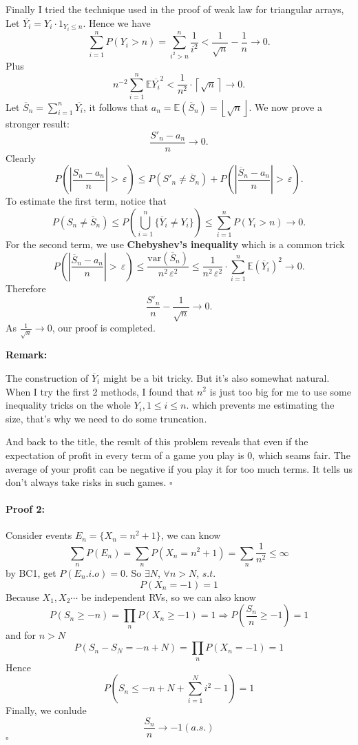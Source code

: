 \documentclass[UTF8]{article}
\let\ldots\cdots
\newcommand\ep{\,\varepsilon}
\begin{document}
		Finally I tried the technique used in the proof of weak law for triangular arrays, 
		Let $\overline{Y_{i}}= Y_{i} \cdot 1_{Y_{i} \le  n}$. Hence we have 
		\[
				\sum_{i=1}^{n} P\left( Y_{i} > n \right) = 
				\sum_{i^2 > n}^{n} \frac{1}{i^2} < \frac{1}{\sqrt{n} } - \frac{1}{n}
				\to  0
		.\]
		Plus 
		\[
		n^{-2} \sum_{i=1}^{n} \mathbb{E} \overline{Y_i}^2 < 
		\frac{1}{n^2} \cdot \left\lceil \sqrt{n}  \right\rceil \to  0 
		.\] 
		Let $\overline{S}_n = \sum_{i=1}^{n} \overline{Y_i}$, it follows 
		that $a_n = \mathbb{E} \left( \overline{S}_n \right) = \left\lfloor \sqrt{n}  \right\rfloor$. We now prove a stronger result: 
		\[
				\frac{ S'_n -a_n }{n} \to  0  
		.\] 
		Clearly
		\[
				P\left( \left| \frac{S_n-a_n}{n} \right| > \ep \right) \le 
				P\left( S'_n \neq \overline{S}_n \right) + 
				P \left( \left| \frac{\overline{S}_n-a_n}{n} \right| > \ep  \right) 
		.\] 
		To estimate the first term, notice that 
		\[
				P\left( S_n \neq \overline{S}_n \right) \le  
				P \left( \bigcup_{i=1}^{n} \{ \overline{Y}_i\neq Y_i\}   \right) 
				\le \sum_{i=1}^{n} P\left( Y_i > n \right) \to 0
		.\] 
		For the second term, we use \textbf{Chebyshev's inequality} which is a 
		common trick
		\[
				P \left( \left| \frac{\overline{S}_n-a_n}{n} \right| > \ep  \right) 
				\le  \frac{ \mathrm{var}\left( \overline{S}_n \right)   }{ n^2\ep^2}
				\le \frac{1}{n^2\ep^2} \cdot \sum_{i=1}^{n} \mathbb{E} \left( \overline{Y}_i \right) ^2 \to 0
		.\] 
		Therefore 
		\[
				\frac{S'_n }{n} - \frac{1}{\sqrt{n} } \to 0 
		.\] 
		As $\frac{1}{\sqrt{n} }\to 0$, our proof is completed.

		\noindent \textbf{Remark:}

		The construction of $\overline{Y}_i$ might be a bit tricky. But it's also somewhat natural. When I try the first 2 methods, I found that $n^2$ is just too big for 
		me to use some inequality tricks on the whole $Y_i,1\le i\le n$. 
		which prevents me estimating the size, that's why we need to do some truncation.

		And back to the title, the result of this problem reveals that even if the 
		expectation of profit in every term of a game you play is 0, which seams 
		fair. The average of your profit
		can be negative if you play it for too much terms. It tells us don't always take 
		risks in such games.
		\hfill$\square$

\paragraph{Proof 2:}
	Consider events $E_n = \{X_n = n^2+1\}$, we can know
	$$
	\sum_n P(E_n) = \sum_n P(X_n = n^2+1)=\sum_n \frac 1 {n^2} \leq \infty
	$$
	by BC1, get $P(E_n.i.o)=0$. So $\exists N$, $\forall n > N$, $s.t.$
	$$
	P(X_n = -1) = 1
	$$
	Because $X_1,X_2\ldots$ be independent RVs, so we can also know
	$$
	P(S_n \geq -n) = \prod _n P(X_n \geq -1) = 1 \Rightarrow P(\frac {S_n} n \geq -1) = 1
	$$
	and for $n > N$
	$$
	P(S_n - S_N = -n + N) = \prod _n P(X_n = -1) = 1
	$$
	Hence
	$$
	P(S_n \leq -n + N + \sum_{i=1}^N {i^2-1})=1
	$$
	Finally, we conlude
	$$
	\frac {S_n} n \rightarrow -1 (a.s.)
	$$
	\hfill$\square$
\end{document}
